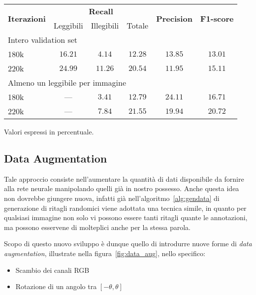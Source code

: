 \begin{table}[H]
\centering
\begin{threeparttable}
	\begin{tabular}{l*{5}c}
		\toprule
		\multirow{2}{*}{\textbf{Iterazioni}} & \multicolumn{3}{c}{\textbf{Recall}} & \multirow{2}{*}{\textbf{Precision}} & \multirow{2}{*}{\textbf{F1-score}} \\
		\cmidrule(lr){2-4}
		& Leggibili & Illegibili & Totale &  &  \\
		\midrule
		\multicolumn{6}{l}{Intero validation set} \\
		180k		& $16.21$ & $4.14$  & $12.28$ & $13.85$ & $13.01$ \\
		220k		& $24.99$ & $11.26$ & $20.54$ & $11.95$ & $15.11$ \\
		\midrule
		\multicolumn{6}{l}{Almeno un leggibile per immagine} \\
		180k		&   ---   & $3.41$ & $12.79$ & $24.11$ & $16.71$ \\
		220k		&   ---   & $7.84$ & $21.55$ & $19.94$ & $20.72$ \\
		\bottomrule
	\end{tabular}
	\begin{tablenotes}
		\item \footnotesize{Valori espressi in percentuale.}
	\end{tablenotes}
\end{threeparttable}
\caption{}\label{tab:finetune}
\end{table}


\subsection{Data Augmentation}
\label{subsec:train_cocoaug}
Tale approccio consiste nell'aumentare la quantità di dati disponibile da fornire alla rete neurale manipolando quelli già in nostro possesso. Anche questa idea non dovrebbe giungere nuova, infatti già nell'algoritmo~\ref{alg:gendata} di generazione di ritagli randomici viene adottata una tecnica simile, in quanto per qualsiasi immagine non solo vi possono essere tanti ritagli quante le annotazioni, ma possono esservene di molteplici anche per la stessa parola.\par
Scopo di questo nuovo sviluppo è dunque quello di introdurre nuove forme di \textit{data augmentation}, illustrate nella figura~\ref{fig:data_aug}, nello specifico:
\begin{itemize}
	\item
		Scambio dei canali RGB
	\item
		Rotazione di un angolo tra $[-\theta, \theta]$
\end{itemize}

